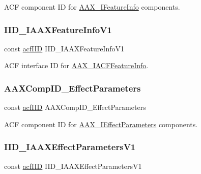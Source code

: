 A\+CF component ID for \mbox{\hyperlink{a01829}{A\+A\+X\+\_\+\+I\+Feature\+Info}} components. 

\mbox{\label{a00683_a4bc11f4b2a3f9c7ca9162c6b3689978e}} 
\subsubsection{\texorpdfstring{IID\_IAAXFeatureInfoV1}{IID\_IAAXFeatureInfoV1}}
{\footnotesize\ttfamily const \mbox{\hyperlink{a00269_a59df0b41744eee7a066787aaedf97f67}{acf\+I\+ID}} I\+I\+D\+\_\+\+I\+A\+A\+X\+Feature\+Info\+V1}



A\+CF interface ID for \mbox{\hyperlink{a01689}{A\+A\+X\+\_\+\+I\+A\+C\+F\+Feature\+Info}}. 

\mbox{\label{a00683_a0f9ba8a7c2177a0fa5042461968fa8ad}} 
\subsubsection{\texorpdfstring{AAXCompID\_EffectParameters}{AAXCompID\_EffectParameters}}
{\footnotesize\ttfamily const \mbox{\hyperlink{a00269_a59df0b41744eee7a066787aaedf97f67}{acf\+I\+ID}} A\+A\+X\+Comp\+I\+D\+\_\+\+Effect\+Parameters}



A\+CF component ID for \mbox{\hyperlink{a01825}{A\+A\+X\+\_\+\+I\+Effect\+Parameters}} components. 

\mbox{\label{a00683_a8379d320e9eabb19428d005fb6499f88}} 
\subsubsection{\texorpdfstring{IID\_IAAXEffectParametersV1}{IID\_IAAXEffectParametersV1}}
{\footnotesize\ttfamily const \mbox{\hyperlink{a00269_a59df0b41744eee7a066787aaedf97f67}{acf\+I\+ID}} I\+I\+D\+\_\+\+I\+A\+A\+X\+Effect\+Parameters\+V1}



